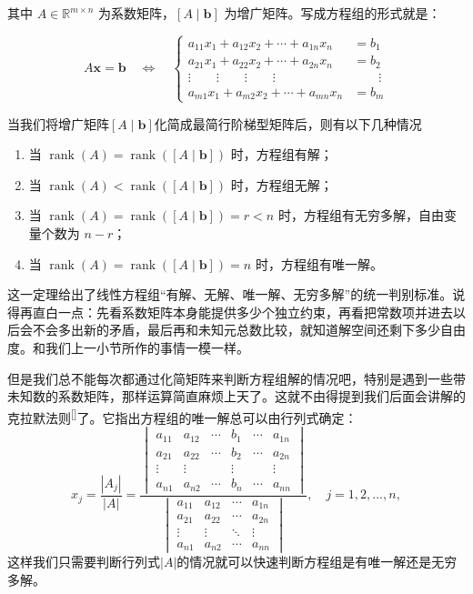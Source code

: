 \documentclass[UTF8]{ctexbook}
\begin{document}
其中 $A\in\mathbb{R}^{m\times n}$ 为系数矩阵，$[A\mid \mathbf{b}]$ 为增广矩阵。写成方程组的形式就是：

\[
A\mathbf{x}=\mathbf{b}\quad\Longleftrightarrow\quad
\left\{\begin{aligned}
a_{11}x_1 + a_{12}x_2 + \cdots + a_{1n}x_n &= b_1 \\
a_{21}x_1 + a_{22}x_2 + \cdots + a_{2n}x_n &= b_2 \\
\vdots\qquad \vdots\qquad \vdots\qquad \vdots &\qquad \vdots \\
a_{m1}x_1 + a_{m2}x_2 + \cdots + a_{mn}x_n &= b_m
\end{aligned}\right.
\]

当我们将增广矩阵$[A\mid \mathbf{b}]$化简成最简行阶梯型矩阵后，则有以下几种情况

\begin{enumerate}
  \item 当 $\operatorname{rank}(A)=\operatorname{rank}([A\mid \mathbf{b}])$ 时，方程组有解；
  \item 当 $\operatorname{rank}(A)<\operatorname{rank}([A\mid \mathbf{b}])$ 时，方程组无解；
  \item 当 $\operatorname{rank}(A)=\operatorname{rank}([A\mid \mathbf{b}])=r<n$ 时，方程组有无穷多解，自由变量个数为 $n-r$；
 \item 当 $\operatorname{rank}(A)=\operatorname{rank}([A\mid \mathbf{b}])=n$ 时，方程组有唯一解。
\end{enumerate}

这一定理给出了线性方程组“有解、无解、唯一解、无穷多解”的统一判别标准。说得再直白一点：先看系数矩阵本身能提供多少个独立约束，再看把常数项并进去以后会不会多出新的矛盾，最后再和未知元总数比较，就知道解空间还剩下多少自由度。和我们上一小节所作的事情一模一样。

但是我们总不能每次都通过化简矩阵来判断方程组解的情况吧，特别是遇到一些带未知数的系数矩阵，那样运算简直麻烦上天了。这就不由得提到我们后面会讲解的克拉默法则\textsuperscript{[\pageref{Cramer}]}了。它指出方程组的唯一解总可以由行列式确定：
\[
x_j=\frac{|A_j|}{|A|}= \frac{
\begin{vmatrix}
a_{11} & a_{12} & \cdots & b_1 & \cdots & a_{1n} \\
a_{21} & a_{22} & \cdots & b_2 & \cdots & a_{2n} \\
\vdots & \vdots & & \vdots & & \vdots \\
a_{n1} & a_{n2} & \cdots & b_n & \cdots & a_{nn}
\end{vmatrix}
}{
\begin{vmatrix}
a_{11} & a_{12} & \cdots & a_{1n} \\
a_{21} & a_{22} & \cdots & a_{2n} \\
\vdots & \vdots & \ddots & \vdots \\
a_{n1} & a_{n2} & \cdots & a_{nn}
\end{vmatrix}
}, \quad j = 1, 2, \dots, n,
\]
这样我们只需要判断行列式$|A|$的情况就可以快速判断方程组是有唯一解还是无穷多解。
\end{document}

